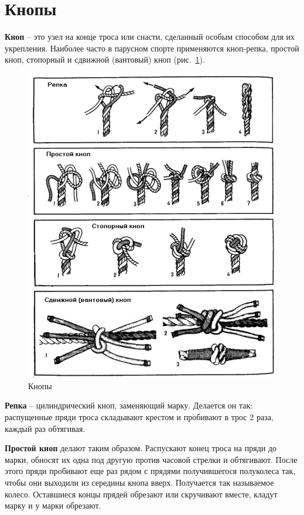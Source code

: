 \documentclass[a4paper, 12pt, twoside, final]{scrbook}
\begin{document}
\section{Кнопы}

\textbf{Кноп} \--- это узел на конце троса или снасти, сделанный особым способом для их укрепления. Наиболее часто в парусном спорте применяются кноп-репка, простой кноп, стопорный и сдвижной (вантовый) кноп (рис.~\ref{fig:69}).

\begin{figure}[htbp]
   \centering
   \includegraphics{pics/69_Knopy} %
   \caption{Кнопы}
   \label{fig:69}
\end{figure}

\textbf{Репка} \--- цилиндрический кноп, заменяющий марку. Делается он так: распущенные пряди троса складывают крестом и пробивают в трос 2 раза, каждый раз обтягивая.

\textbf{Простой кноп} делают таким образом. Распускают конец троса на пряди до марки, обносят их одна под другую против часовой стрелки и обтягивают. После этого пряди пробивают еще раз рядом с прядями получившегося полуколеса так, чтобы они выходили из середины кнопа вверх. Получается так называемое колесо. Оставшиеся концы прядей обрезают или скручивают вместе, кладут марку и у марки обрезают.
\end{document}
